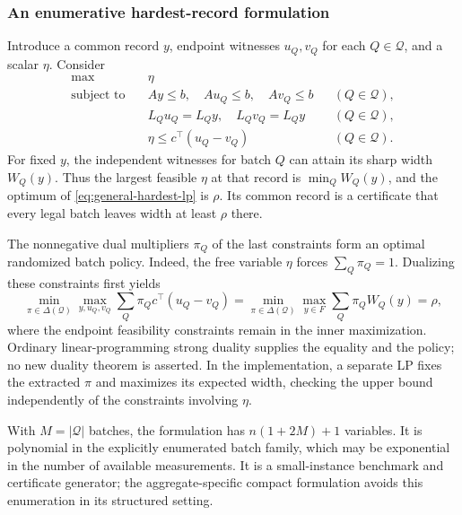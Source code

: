 \documentclass[12pt]{article}
\begin{document}
\subsubsection{An enumerative hardest-record formulation}
Introduce a common record $y$, endpoint witnesses $u_Q,v_Q$ for each
$Q\in\mathcal Q$, and a scalar $\eta$. Consider
\begin{equation}\label{eq:general-hardest-lp}
\begin{aligned}
\max\quad &\eta\\
\text{subject to}\quad &Ay\le b,\quad Au_Q\le b,\quad Av_Q\le b
                         &&(Q\in\mathcal Q),\\
&L_Qu_Q=L_Qy,\quad L_Qv_Q=L_Qy &&(Q\in\mathcal Q),\\
&\eta\le c^\top(u_Q-v_Q) &&(Q\in\mathcal Q).
\end{aligned}
\end{equation}
For fixed $y$, the independent witnesses for batch $Q$ can attain its sharp
width $W_Q(y)$. Thus the largest feasible $\eta$ at that record is
$\min_Q W_Q(y)$, and the optimum of \eqref{eq:general-hardest-lp} is $\rho$.
Its common record is a certificate that every legal batch leaves width at
least $\rho$ there.

The nonnegative dual multipliers $\pi_Q$ of the last constraints form an
optimal randomized batch policy. Indeed, the free variable $\eta$ forces
$\sum_Q\pi_Q=1$. Dualizing these constraints first yields
\[
\min_{\pi\in\Delta(\mathcal Q)}
 \max_{y,u_Q,v_Q}\sum_Q\pi_Qc^\top(u_Q-v_Q)
 =\min_{\pi\in\Delta(\mathcal Q)}\max_{y\in F}
       \sum_Q\pi_Q W_Q(y)=\rho,
\]
where the endpoint feasibility constraints remain in the inner maximization.
Ordinary linear-programming strong duality supplies the equality and the
policy; no new duality theorem is asserted. In the implementation, a separate
LP fixes the extracted $\pi$ and maximizes its expected width, checking the
upper bound independently of the constraints involving $\eta$.

With $M=|\mathcal Q|$ batches, the formulation has $n(1+2M)+1$ variables.
It is polynomial in the explicitly enumerated batch family, which may be
exponential in the number of available measurements. It is a small-instance
benchmark and certificate generator; the aggregate-specific compact
formulation avoids this enumeration in its structured setting.
\end{document}
